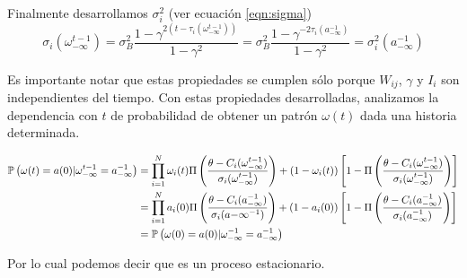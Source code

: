 Finalmente desarrollamos $\sigma_i^2$ (ver ecuación \eqref{eqn:sigma})
\begin{equation}
  \sigma_i(\omega_{-\infty}^{t-1})= \sigma_B^2 \frac{1-\gamma^{2(t-\tau_i(\omega_{-\infty}^{t-1}))}}{1-\gamma^2} = \sigma_B^2 \frac{1-\gamma^{-2 \tau_i(a_{-\infty}^{-1})}}{1-\gamma^2} = \sigma_i^2(a_{-\infty}^{-1})
\end{equation}

Es importante notar que estas propiedades se cumplen sólo porque $W_{ij}$, $\gamma$ y $I_i$ son independientes del tiempo. Con estas propiedades desarrolladas, analizamos la dependencia con $t$ de probabilidad de obtener un patrón $\omega(t)$ dada una historia determinada.

\begin{align}
    \nonumber    \mathbb{P}\left(\omega(t)=a(0) | \omega_{-\infty}^{t-1}=a_{-\infty}^{-1}\right) &= \prod_{i=1}^N \omega_i(t) \Pi\left( \frac{\theta - C_i(\omega_{-\infty}^{t-1})}{\sigma_i(\omega_{-\infty}^{t-1})}\right)+(1-\omega_i(t)) \left[ 1-\Pi\left(\frac{\theta - C_i(\omega_{-\infty}^{t-1})}{\sigma_i(\omega_{-\infty}^{t-1})}\right)\right] \\
    \nonumber    & = \prod_{i=1}^N a_i(0) \Pi\left( \frac{\theta - C_i(a_{-\infty}^{-1})}{\sigma_i(a{-\infty}^{-1})}\right)+(1-a_i(0)) \left[ 1-\Pi\left(\frac{\theta - C_i(a_{-\infty}^{-1})}{\sigma_i(a_{-\infty}^{-1})}\right)\right] \\
    &=\mathbb{P}\left(\omega(0)=a(0) | \omega_{-\infty}^{-1}=a_{-\infty}^{-1}\right)
\end{align}

Por lo cual podemos decir que es un proceso estacionario.
